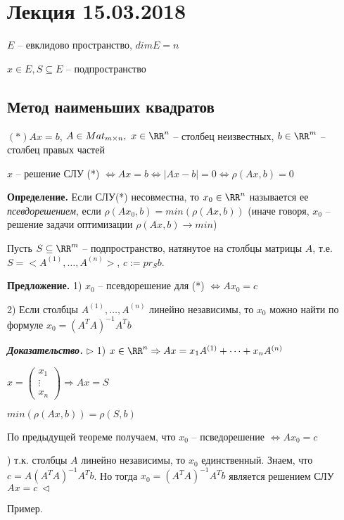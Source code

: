 \section{Лекция 15.03.2018}

$E$ -- евклидово пространство, $dimE = n$

$x \in E, S \subseteq E$ -- подпространство

\bigskip
\subsection{Метод наименьших квадратов}

$(*) Ax = b$, $A \in Mat_{m \times n}, \ x \in \RR^n$ -- столбец неизвестных, $b \in \RR^m$ -- столбец правых частей

$x$ -- решение СЛУ (*) $\Leftrightarrow Ax = b \Leftrightarrow |Ax - b| = 0 \Leftrightarrow \rho (Ax, b) = 0$

\bigskip
\textbf{Определение.} Если СЛУ(*) несовместна, то $x_0 \in \RR^n$ называется ее \textit{псевдорешением}, если $\rho(Ax_0, b) = min (\rho(Ax, b))$ (иначе говоря, $x_0$ -- решение задачи оптимизации $\rho(Ax, b) \rightarrow min$)

\bigskip
Пусть $S \subseteq \RR^m$ -- подпространство, натянутое на столбцы матрицы $A$, т.е. $S = <A^{(1)}, \dots, A^{(n)}>$, $c := pr_S b$.

\bigskip
\textbf{Предложение.} 1) $x_0$ -- псевдорешение для (*) $\Leftrightarrow Ax_0 = c$

2) Если столбцы $A^{(1)}, \dots, A^{(n)}$ линейно независимы, то $x_0$ можно найти по формуле $x_0 = (A^T A)^{-1} A^T b$

\bigskip
\textbf{\textit{Доказательство.}} $\rhd$ 1) $x \in \RR^n \Rightarrow Ax = x_1 A^{(1)} + \dots + x_n A^{(n)}$

$x = \begin{pmatrix} x_1 \\ \vdots \\ x_n \end{pmatrix} \Rightarrow Ax = S$

$min( \rho (Ax, b)) = \rho (S, b)$

\bigskip
По предыдущей теореме получаем, что $x_0$ -- псведорешение $\Leftrightarrow Ax_0 = c$

) т.к. столбцы $A$ линейно независимы, то $x_0$ единственный. Знаем, что $c = A (A^T A)^{-1} A^T b$. Но тогда $x_0 = (A^T A)^{-1} A^T b$ является решением СЛУ $Ax = c \ \lhd$

\bigskip
Пример.

